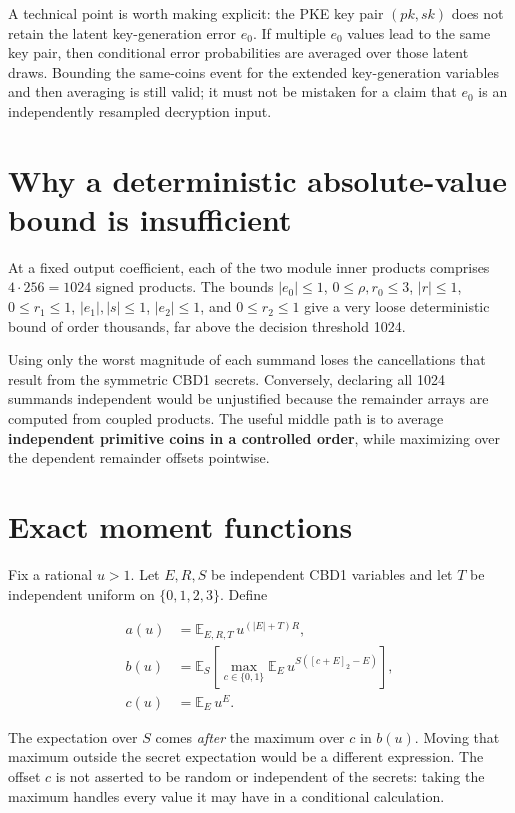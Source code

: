 \documentclass[
  11pt,
  a4paper,
  oneside]{report}
\begin{document}
A technical point is worth making explicit: the PKE key pair \((pk,sk)\)
does not retain the latent key-generation error \(e_0\). If multiple
\(e_0\) values lead to the same key pair, then conditional error
probabilities are averaged over those latent draws. Bounding the
same-coins event for the extended key-generation variables and then
averaging is still valid; it must not be mistaken for a claim that
\(e_0\) is an independently resampled decryption input.

\section{Why a deterministic absolute-value bound is
insufficient}\label{why-a-deterministic-absolute-value-bound-is-insufficient}

At a fixed output coefficient, each of the two module inner products
comprises \(4\cdot256=1024\) signed products. The bounds \(|e_0|\le1\),
\(0\le\rho,r_0\le3\), \(|r|\le1\), \(0\le r_1\le1\), \(|e_1|,|s|\le1\),
\(|e_2|\le1\), and \(0\le r_2\le1\) give a very loose deterministic
bound of order thousands, far above the decision threshold 1024.

Using only the worst magnitude of each summand loses the cancellations
that result from the symmetric CBD1 secrets. Conversely, declaring all
1024 summands independent would be unjustified because the remainder
arrays are computed from coupled products. The useful middle path is to
average \textbf{independent primitive coins in a controlled order},
while maximizing over the dependent remainder offsets pointwise.

\section{Exact moment functions}\label{exact-moment-functions}

Fix a rational \(u>1\). Let \(E,R,S\) be independent CBD1 variables and
let \(T\) be independent uniform on \(\{0,1,2,3\}\). Define

\[
\begin{aligned}
a(u)&=\mathbb E_{E,R,T}\,u^{(|E|+T)R},\\
b(u)&=\mathbb E_{S}\left[\max_{c\in\{0,1\}}
\mathbb E_E\,u^{S([c+E]_2-E)}\right],\\
c(u)&=\mathbb E_E\,u^E.
\end{aligned}
\]

The expectation over \(S\) comes \emph{after} the maximum over \(c\) in
\(b(u)\). Moving that maximum outside the secret expectation would be a
different expression. The offset \(c\) is not asserted to be random or
independent of the secrets: taking the maximum handles every value it
may have in a conditional calculation.
\end{document}
